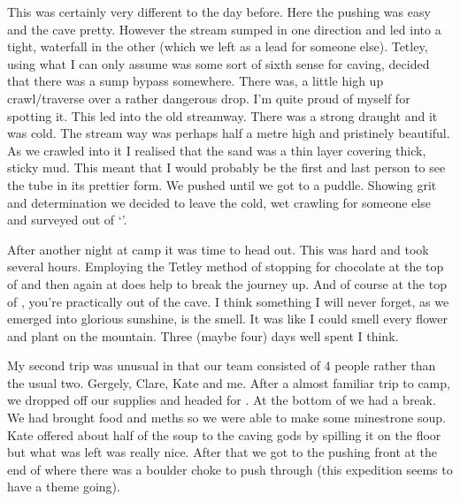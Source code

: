 This was certainly very different to the day before. Here the pushing was easy and the cave pretty. However the stream sumped in one direction and led into a tight, waterfall in the other (which we left as a lead for someone else). Tetley, using what I can only assume was some sort of sixth sense for caving, decided that there was a sump bypass somewhere. There was, a little high up crawl/traverse over a rather dangerous drop. I’m quite proud of myself for spotting it. This led into the old streamway. There was a strong draught and it was cold. The stream way was perhaps half a metre high and pristinely beautiful. As we crawled into it I realised that the sand was a thin layer covering thick, sticky mud. This meant that I would probably be the first and last person to see the tube in its prettier form. We pushed until we got to a puddle. Showing grit and determination we decided to leave the cold, wet crawling for someone else and surveyed out of ‘’.


After another night at camp it was time to head out. This was hard and took several hours. Employing the Tetley method of stopping for chocolate at the top of  and then again at  does help to break the journey up. And of course at the top of , you’re practically out of the cave. I think something I will never forget, as we emerged into glorious sunshine, is the smell. It was like I could smell every flower and plant on the mountain. Three (maybe four) days well spent I think.

My second trip was unusual in that our team consisted of 4 people rather than the usual two. Gergely, Clare, Kate and me. After a almost familiar trip to camp, we dropped off our supplies and headed for . At the bottom of  we had a break. We had brought food and meths so we were able to make some minestrone soup. Kate offered about half of the soup to the caving gods by spilling it on the floor but what was left was really nice. After that we got to the pushing front at the end of  where there was a boulder choke to push through (this expedition seems to have a theme going). 


